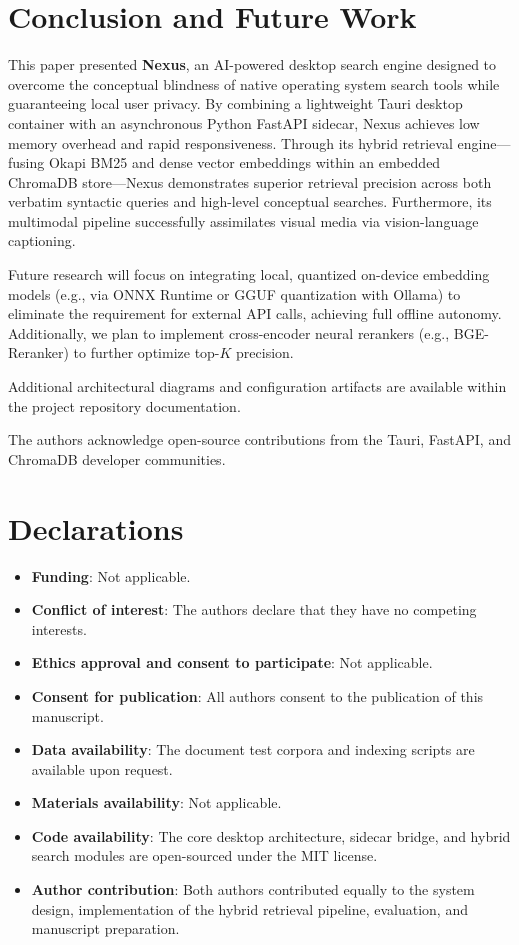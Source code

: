 \documentclass[pdflatex,sn-mathphys-num]{sn-jnl}%
\theoremstyle{thmstyleone}%
\theoremstyle{thmstyletwo}%
\theoremstyle{thmstylethree}%
\begin{document}
\section{Conclusion and Future Work}\label{sec8}

This paper presented \textbf{Nexus}, an AI-powered desktop search engine designed to overcome the conceptual blindness of native operating system search tools while guaranteeing local user privacy. By combining a lightweight Tauri desktop container with an asynchronous Python FastAPI sidecar, Nexus achieves low memory overhead and rapid responsiveness. Through its hybrid retrieval engine---fusing Okapi BM25 and dense vector embeddings within an embedded ChromaDB store---Nexus demonstrates superior retrieval precision across both verbatim syntactic queries and high-level conceptual searches. Furthermore, its multimodal pipeline successfully assimilates visual media via vision-language captioning.

Future research will focus on integrating local, quantized on-device embedding models (e.g., via ONNX Runtime or GGUF quantization with Ollama) to eliminate the requirement for external API calls, achieving full offline autonomy. Additionally, we plan to implement cross-encoder neural rerankers (e.g., BGE-Reranker) to further optimize top-$K$ precision.

\backmatter

Additional architectural diagrams and configuration artifacts are available within the project repository documentation.

The authors acknowledge open-source contributions from the Tauri, FastAPI, and ChromaDB developer communities.

\section*{Declarations}

\begin{itemize}
\item \textbf{Funding}: Not applicable.
\item \textbf{Conflict of interest}: The authors declare that they have no competing interests.
\item \textbf{Ethics approval and consent to participate}: Not applicable.
\item \textbf{Consent for publication}: All authors consent to the publication of this manuscript.
\item \textbf{Data availability}: The document test corpora and indexing scripts are available upon request.
\item \textbf{Materials availability}: Not applicable.
\item \textbf{Code availability}: The core desktop architecture, sidecar bridge, and hybrid search modules are open-sourced under the MIT license.
\item \textbf{Author contribution}: Both authors contributed equally to the system design, implementation of the hybrid retrieval pipeline, evaluation, and manuscript preparation.
\end{itemize}
\end{document}
